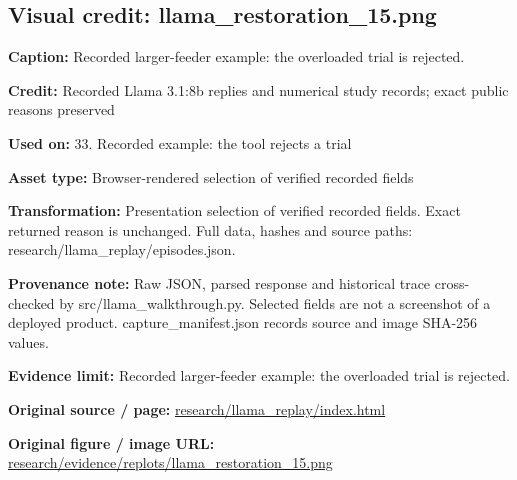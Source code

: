 \documentclass[10pt,letterpaper]{article}
\begin{document}
\subsection*{Visual credit: llama\_restoration\_15.png}
\textbf{Caption:} Recorded larger-feeder example: the overloaded trial is rejected.\par
\textbf{Credit:} Recorded Llama 3.1:8b replies and numerical study records; exact public reasons preserved\par
\textbf{Used on:} 33. Recorded example: the tool rejects a trial\par
\textbf{Asset type:} Browser-rendered selection of verified recorded fields\par
\textbf{Transformation:} Presentation selection of verified recorded fields. Exact returned reason is unchanged. Full data, hashes and source paths: research/llama\_replay/episodes.json.\par
\textbf{Provenance note:} Raw JSON, parsed response and historical trace cross-checked by src/llama\_walkthrough.py. Selected fields are not a screenshot of a deployed product. capture\_manifest.json records source and image SHA-256 values.\par
\textbf{Evidence limit:} Recorded larger-feeder example: the overloaded trial is rejected.\par
\textbf{Original source / page:} \href{../research/llama_replay/index.html}{\small\ttfamily research/\allowbreak{}llama\_\allowbreak{}replay/\allowbreak{}index.\allowbreak{}html}\par
\textbf{Original figure / image URL:} \href{../research/evidence/replots/llama_restoration_15.png}{\small\ttfamily research/\allowbreak{}evidence/\allowbreak{}replots/\allowbreak{}llama\_\allowbreak{}restoration\_\allowbreak{}15.\allowbreak{}png}\par
\par\medskip
\end{document}
